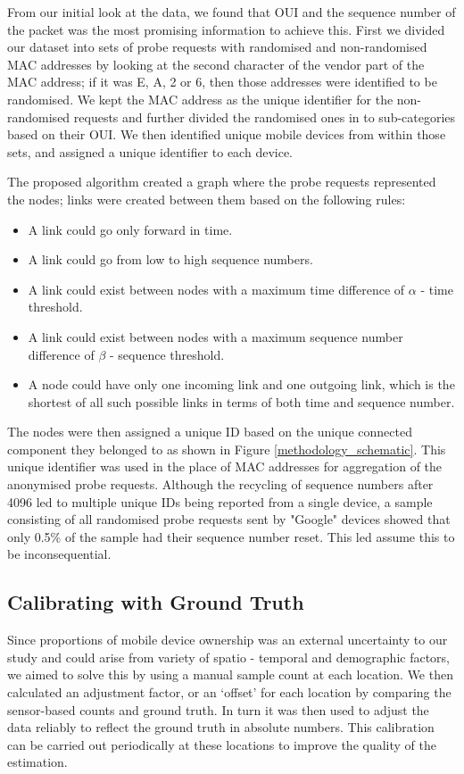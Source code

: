 From our initial look at the data, we found that OUI and the sequence number of
the packet was the most promising information to achieve this.  First we divided
our dataset into sets of probe requests with randomised and non-randomised MAC
addresses by looking at the second character of the vendor part of the MAC
address; if it was E, A, 2 or 6, then those addresses were identified to be
randomised. We kept the MAC address as the unique identifier for the
non-randomised requests and further divided the randomised ones in to
sub-categories based on their OUI. We then  identified unique mobile devices
from within those sets, and assigned a unique identifier to each device.

The proposed algorithm created a graph where the probe requests represented the
nodes; links were created between them based on the following rules:

\begin{itemize} 
\item A link could go only forward in time. 
\item A link could go from low to high sequence numbers. 
\item A link could exist between nodes with a maximum time difference of
	$\alpha$ - time threshold. 
\item A link could exist between nodes with a maximum sequence number
	difference of $\beta$ - sequence threshold.
\item A node could have only one incoming link and one outgoing link, which is
	the shortest of all such possible links in terms of both time and sequence
	number.
\end{itemize}

The nodes were then assigned a unique ID based on the unique connected component
they belonged to as shown in Figure \ref{methodology_schematic}. This unique
identifier was used in the place of MAC addresses for aggregation of the
anonymised probe requests. Although the recycling of sequence numbers after 4096
led to multiple unique IDs being reported from a single device, a sample
consisting of all randomised probe requests sent by "Google" devices showed that
only 0.5\% of the sample had their sequence number reset. This led assume this
to be inconsequential. 

\subsection{Calibrating with Ground Truth} 

Since proportions of mobile device ownership was an external uncertainty to our
study and could arise from variety of spatio - temporal and demographic factors,
we aimed to solve this by using a manual sample count at each location. We then
calculated an adjustment factor, or an `offset' for each location by comparing
the sensor-based counts and ground truth. In turn it was then used to adjust the
data reliably to reflect the ground truth in absolute numbers.  This calibration
can be carried out periodically at these locations to improve the quality of the
estimation.
